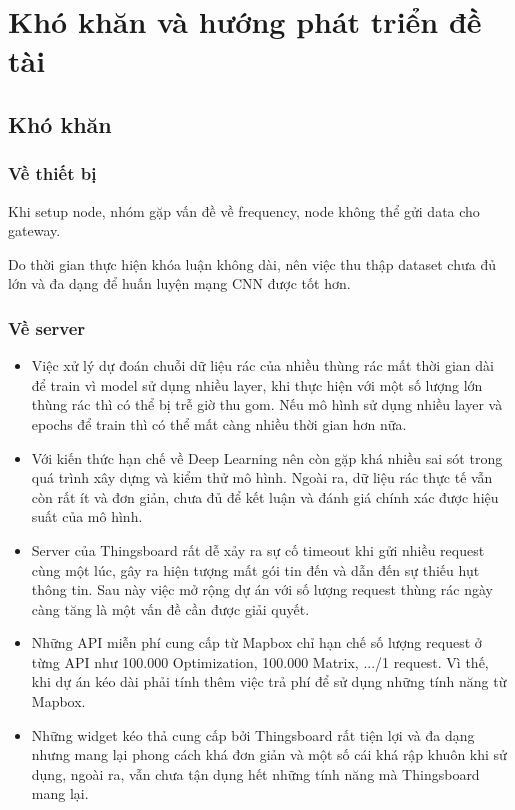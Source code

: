 

\chapter{Khó khăn và hướng phát triển đề tài}


\section{Khó khăn}
\subsection{Về thiết bị}
Khi setup node, nhóm gặp vấn đề về frequency, node không thể gửi data cho gateway.

Do thời gian thực hiện khóa luận không dài, nên việc thu thập dataset chưa đủ lớn và đa dạng để huấn luyện mạng CNN được tốt hơn.

\subsection{Về server}
\begin{itemize}
    \item Việc xử lý dự đoán chuỗi dữ liệu rác của nhiều thùng rác mất thời gian dài để train vì model sử dụng nhiều layer, khi thực hiện với một số lượng lớn thùng rác thì có thể bị trễ giờ thu gom. Nếu mô hình sử dụng nhiều layer và epochs để train thì có thể mất càng nhiều thời gian hơn nữa.
    \item Với kiến thức hạn chế về Deep Learning nên còn gặp khá nhiều sai sót trong quá trình xây dựng và kiểm thử mô hình. Ngoài ra, dữ liệu rác thực tế vẫn còn rất ít và đơn giản, chưa đủ để kết luận và đánh giá chính xác được hiệu suất của mô hình. 
    \item Server của Thingsboard rất dễ xảy ra sự cố timeout khi gửi nhiều request cùng một lúc, gây ra hiện tượng mất gói tin đến và dẫn đến sự thiếu hụt thông tin. Sau này việc mở rộng dự án với số lượng request thùng rác ngày càng tăng là một vấn đề cần được giải quyết.
    \item Những API miễn phí cung cấp từ Mapbox chỉ hạn chế số lượng request ở từng API như 100.000 Optimization, 100.000 Matrix, .../1 request. Vì thế, khi dự án kéo dài phải tính thêm việc trả phí để sử dụng những tính năng từ Mapbox.
    \item Những widget kéo thả cung cấp bởi Thingsboard rất tiện lợi và đa dạng nhưng mang lại phong cách khá đơn giản và một số cái khá rập khuôn khi sử dụng, ngoài ra, vẫn chưa tận dụng hết những tính năng mà Thingsboard mang lại.      
\end{itemize}

